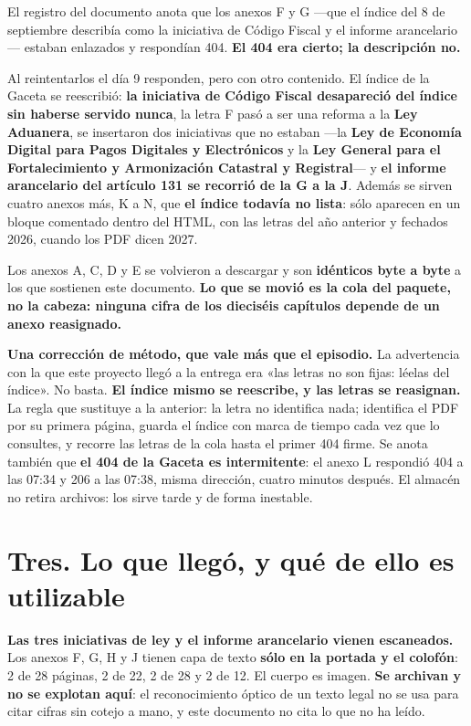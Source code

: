 El registro del documento anota que los anexos F y G ---que el índice del 8 de septiembre
describía como la iniciativa de Código Fiscal y el informe arancelario--- estaban enlazados
y respondían 404. \textbf{El 404 era cierto; la descripción no.}

Al reintentarlos el día 9 responden, pero con otro contenido. El índice de la Gaceta se
reescribió: \textbf{la iniciativa de Código Fiscal desapareció del índice sin haberse
servido nunca}, la letra F pasó a ser una reforma a la \textbf{Ley Aduanera}, se insertaron
dos iniciativas que no estaban ---la \textbf{Ley de Economía Digital para Pagos Digitales y
Electrónicos} y la \textbf{Ley General para el Fortalecimiento y Armonización Catastral y
Registral}--- y \textbf{el informe arancelario del artículo 131 se recorrió de la G a la J}.
Además se sirven cuatro anexos más, K a N, que \textbf{el índice todavía no lista}: sólo
aparecen en un bloque comentado dentro del HTML, con las letras del año anterior y fechados
2026, cuando los PDF dicen 2027.



Los anexos A, C, D y E se volvieron a descargar y son \textbf{idénticos byte a byte} a los
que sostienen este documento. \textbf{Lo que se movió es la cola del paquete, no la cabeza:
ninguna cifra de los dieciséis capítulos depende de un anexo reasignado.}

\textbf{Una corrección de método, que vale más que el episodio.} La advertencia con la que
este proyecto llegó a la entrega era «las letras no son fijas: léelas del índice». No basta.
\textbf{El índice mismo se reescribe, y las letras se reasignan.} La regla que sustituye a la
anterior: la letra no identifica nada; identifica el PDF por su primera página, guarda el
índice con marca de tiempo cada vez que lo consultes, y recorre las letras de la cola hasta
el primer 404 firme. Se anota también que \textbf{el 404 de la Gaceta es intermitente}: el
anexo L respondió 404 a las 07:34 y 206 a las 07:38, misma dirección, cuatro minutos después.
El almacén no retira archivos: los sirve tarde y de forma inestable.

\section*{Tres. Lo que llegó, y qué de ello es utilizable}

\textbf{Las tres iniciativas de ley y el informe arancelario vienen escaneados.} Los anexos
F, G, H y J tienen capa de texto \textbf{sólo en la portada y el colofón}: 2 de 28 páginas,
2 de 22, 2 de 28 y 2 de 12. El cuerpo es imagen. \textbf{Se archivan y no se explotan aquí}:
el reconocimiento óptico de un texto legal no se usa para citar cifras sin cotejo a mano, y
este documento no cita lo que no ha leído.

